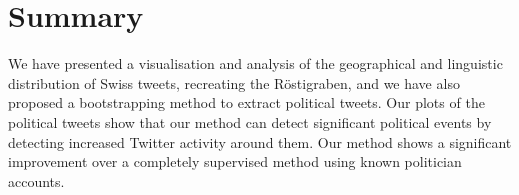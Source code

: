 \section{Summary}
We have presented a visualisation and analysis of the geographical and linguistic distribution of Swiss tweets, recreating the R\"ostigraben, and we have also proposed a bootstrapping method to extract political tweets. Our plots of the political tweets show that our method can detect significant political events by detecting increased Twitter activity around them. Our method shows a significant improvement over a completely supervised method using known politician accounts.